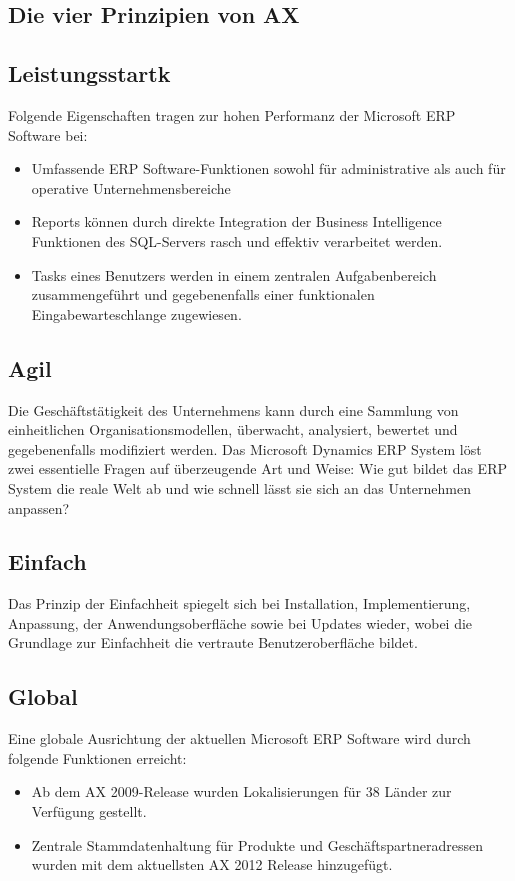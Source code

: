 \documentclass[a4paper]{article}
\begin{document}
\begin{sloppypar}
\subsection{Die vier Prinzipien von AX}

\subsection{Leistungsstartk}

Folgende Eigenschaften tragen zur hohen Performanz der Microsoft ERP Software bei:
\begin{itemize}
\item Umfassende ERP Software-Funktionen sowohl für administrative als auch für operative Unternehmensbereiche
\item Reports können durch direkte Integration der Business Intelligence Funktionen des SQL-Servers rasch und effektiv verarbeitet werden.
\item Tasks eines Benutzers werden in einem zentralen Aufgabenbereich zusammengeführt und gegebenenfalls einer funktionalen Eingabewarteschlange zugewiesen.
\end{itemize}

\subsection{Agil}

Die Geschäftstätigkeit des Unternehmens kann durch eine Sammlung von einheitlichen Organisationsmodellen, überwacht, analysiert, bewertet und gegebenenfalls modifiziert werden.
Das Microsoft Dynamics ERP System löst zwei essentielle Fragen auf überzeugende Art und Weise: 
Wie gut bildet das ERP System die reale Welt ab und wie schnell lässt sie sich an das Unternehmen anpassen?

\subsection{Einfach}

Das Prinzip der Einfachheit spiegelt sich bei Installation, Implementierung, Anpassung, der Anwendungsoberfläche sowie bei Updates wieder, wobei die Grundlage zur Einfachheit die vertraute Benutzeroberfläche bildet.

\subsection{Global}

Eine globale Ausrichtung der aktuellen Microsoft ERP Software wird durch folgende Funktionen erreicht:

\begin{itemize}
\item Ab dem AX 2009-Release wurden Lokalisierungen für 38 Länder zur Verfügung gestellt.
\item Zentrale Stammdatenhaltung für Produkte und Geschäftspartneradressen wurden mit dem aktuellsten AX 2012 Release hinzugefügt.
\end{itemize}





\end{sloppypar}
\end{document}
